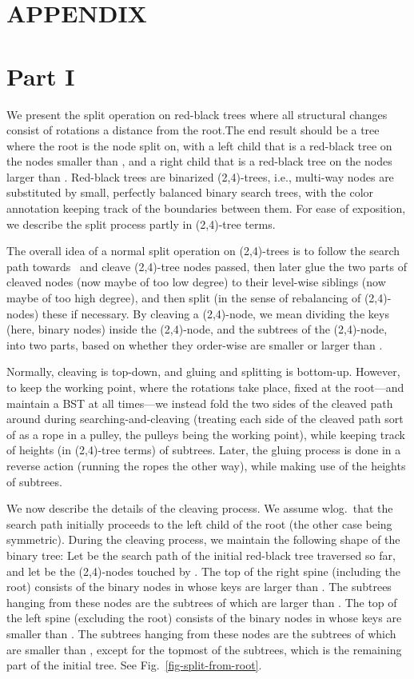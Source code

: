 \documentclass[letterpaper,11pt]{article}
\begin{document}
    


\newpage
\section*{APPENDIX}

\section*{Part I}

We present the split operation on red-black trees where all structural 
changes consist of rotations a distance  from the root.The end 
result should be a tree where the root is the node  split on, 
with a left child that is a red-black tree on the nodes smaller than ,
and a right child that is a red-black tree on the nodes larger than
. Red-black trees are binarized (2,4)-trees, i.e., multi-way nodes are
substituted by small, perfectly balanced binary search trees, with the
color annotation keeping track of the boundaries between them. For ease of
exposition, we describe the split process partly in (2,4)-tree terms.

The overall idea of a normal split operation on (2,4)-trees is to follow
the search path towards~ and cleave (2,4)-tree nodes passed, then later
glue the two parts of cleaved nodes (now maybe of too low degree) to their
level-wise siblings (now maybe of too high degree), and then split (in the
sense of rebalancing of (2,4)-nodes) these if necessary. By cleaving a
(2,4)-node, we mean dividing the keys (here, binary nodes) inside the
(2,4)-node, and the subtrees of the (2,4)-node, into two parts, based on
whether they order-wise are smaller or larger than .

Normally, cleaving is top-down, and gluing and splitting is bottom-up.
However, to keep the working point, where the rotations take place, fixed
at the root---and maintain a BST at all times---we instead fold the two
sides of the cleaved path around during searching-and-cleaving (treating
each side of the cleaved path sort of as a rope in a pulley, the pulleys
being the working point), while keeping track of heights (in (2,4)-tree
terms) of subtrees. Later, the gluing process is done in a reverse action
(running the ropes the other way), while making use of the heights of
subtrees.

We now describe the details of the cleaving process. We assume wlog.\ that
the search path initially proceeds to the left child of the root (the other
case being symmetric). During the cleaving process, we maintain the
following shape of the binary tree: Let  be the search path of the
initial red-black tree traversed so far, and let  be the
(2,4)-nodes touched by . The top of the right spine (including the root)
consists of the binary nodes in  whose keys are larger than
. The subtrees hanging from these nodes are the subtrees of 
which are larger than .  The top of the left spine (excluding the root)
consists of the binary nodes in  whose keys are smaller than
. The subtrees hanging from these nodes are the subtrees of 
which are smaller than , except for the topmost of the subtrees, which
is the remaining part of the initial tree. See
Fig.~\ref{fig-split-from-root}.
\end{document}
